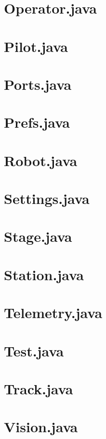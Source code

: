 \newpage\section*{Operator.java}
\newpage\section*{Pilot.java}
\newpage\section*{Ports.java}
\newpage\section*{Prefs.java}
\newpage\section*{Robot.java}
\newpage\section*{Settings.java}
\newpage\section*{Stage.java}
\newpage\section*{Station.java}
\newpage\section*{Telemetry.java}
\newpage\section*{Test.java}
\newpage\section*{Track.java}
\newpage\section*{Vision.java}
